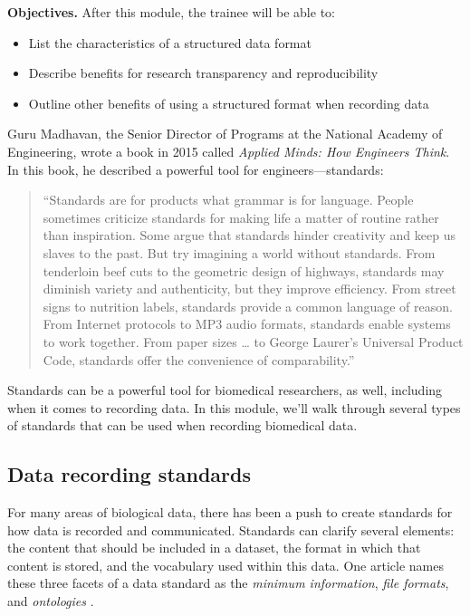 \documentclass[]{tufte-book}
\providecommand{\tightlist}{%
  \setlength{\itemsep}{0pt}\setlength{\parskip}{0pt}}
\begin{document}
\textbf{Objectives.} After this module, the trainee will be able to:

\begin{itemize}
\tightlist
\item
  List the characteristics of a structured data format
\item
  Describe benefits for research transparency and reproducibility
\item
  Outline other benefits of using a structured format when recording data
\end{itemize}

Guru Madhavan, the Senior Director of Programs at the National Academy of
Engineering, wrote a book in 2015 called \emph{Applied Minds: How Engineers Think}.
In this book, he described a powerful tool for engineers---standards:

\begin{quote}
``Standards are for products what grammar is for language. People sometimes
criticize standards for making life a matter of routine rather than inspiration.
Some argue that standards hinder creativity and keep us slaves to the past.
But try imagining a world without standards. From tenderloin beef cuts to
the geometric design of highways, standards may diminish variety and
authenticity, but they improve efficiency. From street signs to nutrition
labels, standards provide a common language of reason. From Internet
protocols to MP3 audio formats, standards enable systems to work together.
From paper sizes \ldots{} to George Laurer's Universal Product Code, standards
offer the convenience of comparability.'' \citep{madhavan2015applied}
\end{quote}

Standards can be a powerful tool for biomedical researchers, as well, including
when it comes to recording data. In this module, we'll walk through several
types of standards that can be used when recording biomedical data.

\subsection{Data recording standards}\label{data-recording-standards}

For many areas of biological data, there has been a push to create standards for
how data is recorded and communicated. Standards can clarify several elements: the content
that should be included in a dataset, the format in which that content is
stored, and the vocabulary used within this data. One article names these three
facets of a data standard as the \emph{minimum information}, \emph{file formats}, and
\emph{ontologies} \citep{ghosh2011software}.
\end{document}
